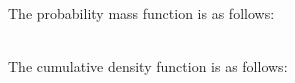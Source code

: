 \documentclass[12pt]{book}
\begin{document}
\newpage
The probability mass function is as follows:\\\\
\begin{figure}[H]
	\centering
\end{figure}
\newpage
The cumulative density function is as follows: \\
\begin{figure}[H]
	\centering
\end{figure}
\end{document}
